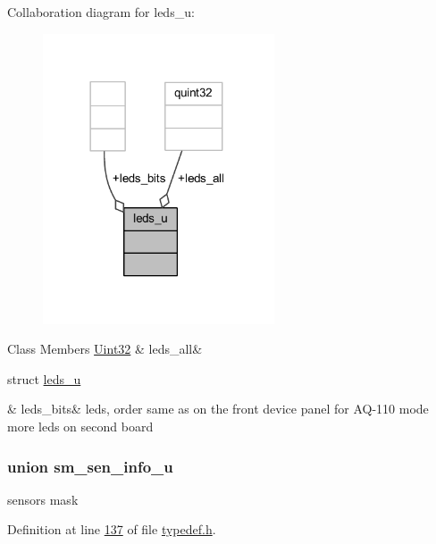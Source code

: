 Collaboration diagram for leds\+\_\+u\+:
\nopagebreak
\begin{figure}[H]
\begin{center}
\leavevmode
\includegraphics[width=194pt]{d6/de1/a00233}
\end{center}
\end{figure}
\begin{DoxyFields}{Class Members}
\hypertarget{a00001_a8ccac3f4b28f182b982eb683e9ca4e68}{\hyperlink{a00001_ab56a7153a5b218eac7698ff141009735}{Uint32}}\label{a00001_a8ccac3f4b28f182b982eb683e9ca4e68}
&
leds\+\_\+all&
\\
\hline

\hypertarget{a00001_a04e04577c459eba22dfe15d27b5f8753}{struct \hyperlink{a00001_df/d13/a00085}{leds\+\_\+u}}\label{a00001_a04e04577c459eba22dfe15d27b5f8753}
&
leds\+\_\+bits&
leds, order same as on the front device panel for A\+Q-\/110 mode more leds on second board \\
\hline

\end{DoxyFields}
\label{d1/d88/a00128}
\hypertarget{a00001_d1/d88/a00128}{}
\subsubsection{union sm\+\_\+sen\+\_\+info\+\_\+u}
sensors mask 

Definition at line \hyperlink{a00001_source_l00137}{137} of file \hyperlink{a00001_source}{typedef.\+h}.



